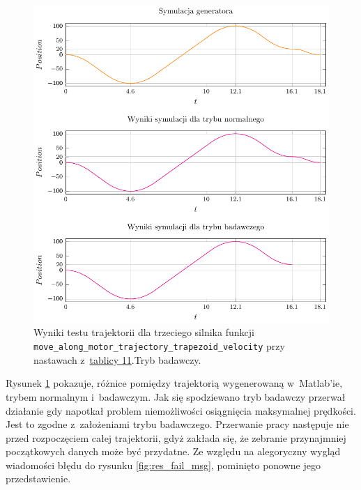 \documentclass[a4paper, 12pt]{article}
\begin{document}
	\begin{figure}[H]
		\centering
		\includegraphics[scale=1.1]{raport_graphs/simpMTVR.pdf}
		\caption{Wyniki testu trajektorii dla trzeciego silnika funkcji \texttt{move\_along\_motor\_trajectory\_trapezoid\_velocity} przy nastawach z~\hyperref[tab:setup5]{tablicy 11}.Tryb badawczy.}		
		\label{fig:simpMTVR}
	\end{figure}
	Rysunek \ref{fig:simpMTVR} pokazuje, różnice pomiędzy trajektorią wygenerowaną w~Matlab'ie, trybem normalnym i~badawczym. Jak się spodziewano tryb badawczy przerwał działanie gdy napotkał problem niemożliwości osiągnięcia maksymalnej prędkości. Jest to zgodne z~założeniami trybu badawczego. Przerwanie pracy następuje nie przed rozpoczęciem całej trajektorii, gdyż zakłada się, że zebranie przynajmniej początkowych danych może być przydatne. Ze względu na alegoryczny wygląd wiadomości błędu do rysunku \ref{fig:res_fail_msg}, pominięto ponowne jego przedstawienie. 
	 
\end{document}
